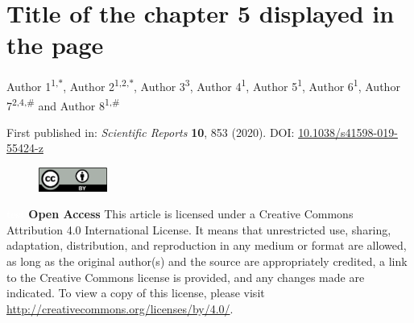 \chapter[Title of the chapter 5 displayed in the table of contents]
    {Title of the chapter 5 displayed in the page
    }
\label{ch:labelchapter5}

\updatemylof %
\updatemylot %

\regularsection
\headerregularsection

Author 1\textsuperscript{1,\textcolor{sophia}{$\ast$}}, Author 2\textsuperscript{1,2,\textcolor{sophia}{$\ast$}}, Author 3\textsuperscript{3}, Author 4\textsuperscript{1}, Author 5\textsuperscript{1}, Author 6\textsuperscript{1}, Author 7\textsuperscript{2,4,\#} and Author 8\textsuperscript{1,\#} \hfill  \newline

\let\thefootnote\relax{}

\noindent First published in: \textit{Scientific Reports} \textbf{10}, 853 (2020). \hfill \break
DOI: \href{https://doi.org/10.1038/s41598-019-55424-z}{10.1038/s41598-019-55424-z} 

\begin{figure}
    \includegraphics[width=0.2\textwidth]{figures/by.png}
\end{figure} 

\noindent \textcolor{white}{test} \newline \textbf{Open Access} This article is licensed under a Creative Commons Attribution 4.0 International License. It means that unrestricted use, sharing, adaptation, distribution, and reproduction in any medium or format are allowed, as long as the original author(s) and the source are appropriately credited, a link to the Creative Commons license is provided, and any changes made are indicated. To view a copy of this license, please visit \href{http://creativecommons.org/licenses/by/4.0/}{http://creativecommons.org/licenses/by/4.0/}. \newline

